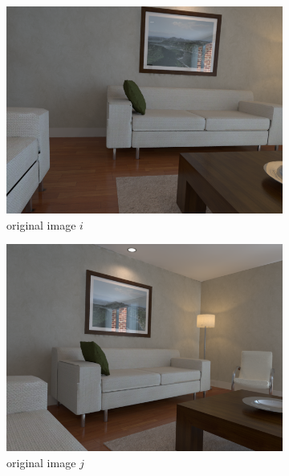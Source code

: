        \begin{figure}[ht]
            \centering
            \begin{subfigure}[b]{.45\textwidth}
                \includegraphics[width=.95\textwidth]{images/vis_perspective_01}
                \caption{original image $i$}
                \label{sfig:i_original}
            \end{subfigure}
            \begin{subfigure}[b]{.45\textwidth}
                \includegraphics[width=.95\textwidth]{images/vis_perspective_03}
                \caption{original image $j$}
                \label{sfig:j_original}
            \end{subfigure}
            \begin{subfigure}[b]{.45\textwidth}

\end{subfigure}
\end{figure}
